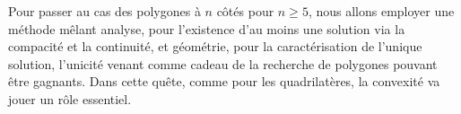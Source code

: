 Pour passer au cas des polygones à $n$ côtés pour $n \geq 5$, nous allons employer une méthode mêlant analyse, pour l'existence d'au moins une solution via la compacité et la continuité, et géométrie, pour la caractérisation de l'unique solution, l'unicité venant comme cadeau de la recherche de polygones pouvant être gagnants.
%
Dans cette quête, comme pour les quadrilatères, la convexité va jouer un rôle essentiel.
